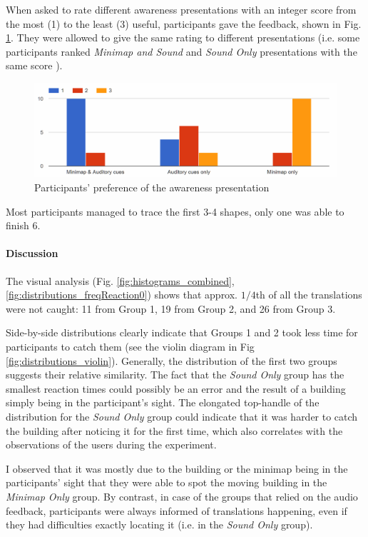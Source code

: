 When asked to rate different awareness presentations with an integer score from the most (1) to the least (3) useful, participants gave the feedback, shown in Fig. \ref{fig:finalstudyawarenesspresentationuserpreference}. They were allowed to give the same rating to different presentations (i.e. some participants ranked \textit{Minimap and Sound} and \textit{Sound Only} presentations with the same score ).

\begin{figure}
	\centering
	\includegraphics[width=0.7\linewidth]{figures/final_study_awareness_presentation_user_preference}
	\caption{Participants' preference of the awareness presentation}
	\label{fig:finalstudyawarenesspresentationuserpreference}
\end{figure}

Most participants managed to trace the first 3-4 shapes, only one was able to finish 6.

\paragraph{Discussion}
The visual analysis (Fig. \ref{fig:histograms_combined}, \ref{fig:distributions_freqReaction0}) shows that approx. $1/4$th of all the translations were not caught: 11 from Group 1, 19 from Group 2, and 26 from Group 3. %

Side-by-side distributions clearly indicate that Groups 1 and 2 took less time for participants to catch them (see the violin diagram in Fig \ref{fig:distributions_violin}). Generally, the distribution of the first two groups suggests their relative similarity. The fact that the \textit{Sound Only} group has the smallest reaction times could possibly be an error and the result of a building simply being in the participant's sight. The elongated top-handle of the distribution for the \textit{Sound Only} group could indicate that it was harder to catch the building after noticing it for the first time, which also correlates with the observations of the users during the experiment.

I observed that it was mostly due to the building or the minimap being in the participants' sight that they were able to spot the moving building in the \textit{Minimap Only} group. By contrast, in case of the groups that relied on the audio feedback, participants were always informed of translations happening, even if they had difficulties exactly locating it (i.e. in the \textit{Sound Only} group).

